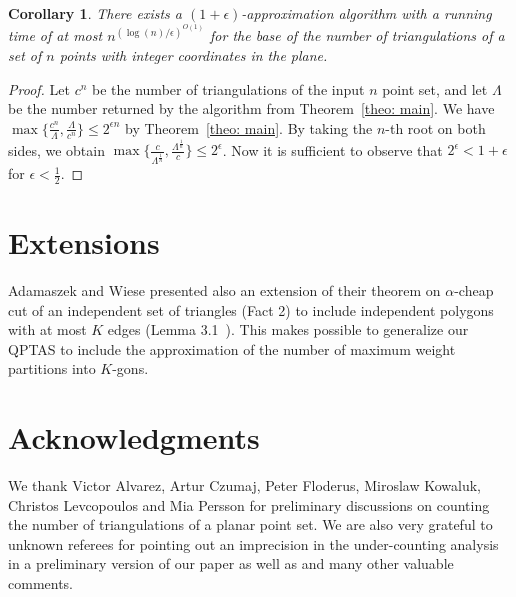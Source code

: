 \documentclass[a4paper]{article}
\newtheorem{corollary}{Corollary}
\begin{document}
\begin{corollary}
There exists a $(1 +\epsilon)$-approximation
algorithm with a running time of at most
$n^{(\log (n) /\epsilon)^{O(1)}}$ for the base
of the number of triangulations of a set
of $n$ points with integer coordinates in the plane.
\end{corollary}
\begin{proof}
Let $c^n$ be the number of triangulations
of the input $n$ point set, and let $\Lambda$
be the number returned by the algorithm
from Theorem~\ref{theo: main}.
We have $\max \{ \frac {c^n} {\Lambda}, \frac {\Lambda} {c^n} \} \le 2^{\epsilon n}$
by Theorem~\ref{theo: main}.
By taking the $n$-th root on both sides, we obtain
$\max \{ \frac {c} {\Lambda^{\frac 1n}}, \frac {\Lambda^{\frac 1n}} {c} \} \le
2^{\epsilon }$.
Now it is sufficient to observe that
$2^{\epsilon} < 1+\epsilon $ for $\epsilon < \frac 12$.
\end{proof}

\section{Extensions}

Adamaszek and Wiese presented also an extension
of their theorem on $\alpha$-cheap cut of an independent
set of triangles (Fact 2) to include independent
polygons with at most $K$ edges (Lemma 3.1~\cite{AW14}). This makes possible
to generalize our QPTAS
to include the approximation of the number
of maximum weight partitions into $K$-gons.

\section*{Acknowledgments}

We thank Victor Alvarez, Artur Czumaj, Peter Floderus, Miroslaw
Kowaluk, Christos Levcopoulos and Mia Persson for preliminary
discussions on counting the number of triangulations of a planar point
set. We are also very grateful to unknown referees for pointing out an
imprecision in the under-counting analysis in a preliminary version of
our paper as well as and many other valuable comments.
\end{document}

